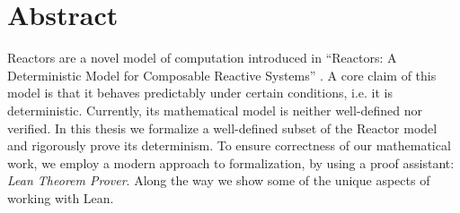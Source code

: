 \section*{Abstract}

Reactors are a novel model of computation introduced in ``Reactors: A Deterministic Model for Composable Reactive Systems'' \cite{cyphy}. 
A core claim of this model is that it behaves predictably under certain conditions, i.e. it is deterministic. 
Currently, its mathematical model is neither well-defined nor verified.  
In this thesis we formalize a well-defined subset of the Reactor model and rigorously prove its determinism.
To ensure correctness of our mathematical work, we employ a modern approach to formalization, by using a proof assistant: \emph{Lean Theorem Prover}.
Along the way we show some of the unique aspects of working with Lean.